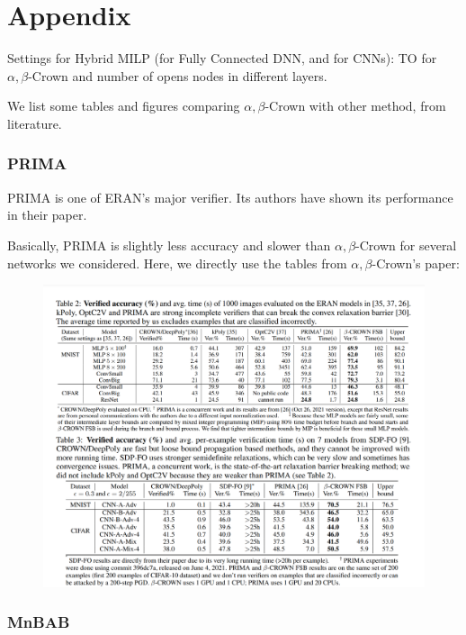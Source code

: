 \section*{Appendix}

Settings for Hybrid MILP (for Fully Connected DNN, and for CNNs): TO for $\alpha,\beta$-Crown
and number of opens nodes in different layers.



We list some tables and figures comparing $\alpha,\beta$-Crown with other method, from literature.

\subsubsection*{PRIMA} 

PRIMA is one of ERAN's major verifier. Its authors have shown its performance in their paper.

Basically, PRIMA is slightly less accuracy and slower than $\alpha,\beta$-Crown for several networks we considered. Here, we directly use the tables from $\alpha,\beta$-Crown's paper:

\begin{figure}[h]
	\includegraphics[scale=0.32]{Cronw_PRIMA.png}
\end{figure}


\subsubsection*{MnBAB} 


